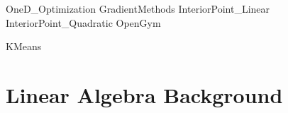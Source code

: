{OneD_Optimization}
{GradientMethods}
{InteriorPoint_Linear}
{InteriorPoint_Quadratic}
{OpenGym}


{KMeans}



\part{Linear Algebra Background}


			


